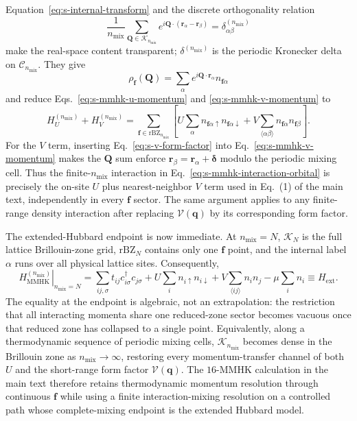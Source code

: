 \documentclass[10pt]{article}
\newcommand{\nmix}{n_{\mathrm{mix}}}
\begin{document}
Equation~\ref{eq:s-internal-transform} and the discrete orthogonality relation
\begin{equation}
 \frac{1}{\nmix}\sum_{\mathbf Q\in\mathcal K_{\nmix}}
 e^{i\mathbf Q\cdot(\mathbf r_\alpha-\mathbf r_\beta)}
 =\delta^{(\nmix)}_{\alpha\beta}
 \label{eq:s-discrete-orthogonality}
\end{equation}
make the real-space content transparent; $\delta^{(\nmix)}$ is the periodic Kronecker delta on $\mathcal C_{\nmix}$. They give
\begin{equation}
 \rho_{\mathbf f}(\mathbf Q)
 =\sum_{\alpha}e^{i\mathbf Q\cdot\mathbf r_\alpha}
 n_{\mathbf f\alpha}
 \label{eq:s-sector-density}
\end{equation}
and reduce Eqs.~\ref{eq:s-mmhk-u-momentum} and \ref{eq:s-mmhk-v-momentum} to
\begin{equation}
 H_U^{(\nmix)}+H_V^{(\nmix)}
 =\sum_{\mathbf f\in\mathrm{rBZ}_{\nmix}}
 \left[
 U\sum_\alpha n_{\mathbf f\alpha\uparrow}n_{\mathbf f\alpha\downarrow}
 +V\sum_{\langle\alpha\beta\rangle}
 n_{\mathbf f\alpha}n_{\mathbf f\beta}
 \right].
 \label{eq:s-mmhk-interaction-orbital}
\end{equation}
For the $V$ term, inserting Eq.~\ref{eq:s-v-form-factor} into Eq.~\ref{eq:s-mmhk-v-momentum} makes the $\mathbf Q$ sum enforce
$\mathbf r_\beta=\mathbf r_\alpha+\boldsymbol\delta$ modulo the periodic mixing cell. Thus the finite-$\nmix$ interaction in Eq.~\ref{eq:s-mmhk-interaction-orbital} is precisely the on-site $U$ plus nearest-neighbor $V$ term used in Eq.~(1) of the main text, independently in every $\mathbf f$ sector. The same argument applies to any finite-range density interaction after replacing $\mathcal V(\mathbf q)$ by its corresponding form factor.

The extended-Hubbard endpoint is now immediate. At $\nmix=N$, $\mathcal K_N$ is the full lattice Brillouin-zone grid, $\mathrm{rBZ}_N$ contains only one $\mathbf f$ point, and the internal label $\alpha$ runs over all physical lattice sites. Consequently,
\begin{equation}
 \boxed{
 \left.H_{\mathrm{MMHK}}^{(\nmix)}\right|_{\nmix=N}
 =\sum_{ij,\sigma}t_{ij}c^\dagger_{i\sigma}c_{j\sigma}
 +U\sum_i n_{i\uparrow}n_{i\downarrow}
 +V\sum_{\langle ij\rangle}n_i n_j
 -\mu\sum_i n_i
 \equiv H_{\mathrm{ext}} .}
 \label{eq:s-extended-hubbard-limit}
\end{equation}
The equality at the endpoint is algebraic, not an extrapolation: the restriction that all interacting momenta share one reduced-zone sector becomes vacuous once that reduced zone has collapsed to a single point. Equivalently, along a thermodynamic sequence of periodic mixing cells, $\mathcal K_{\nmix}$ becomes dense in the Brillouin zone as $\nmix\to\infty$, restoring every momentum-transfer channel of both $U$ and the short-range form factor $\mathcal V(\mathbf q)$. The $16$-MMHK calculation in the main text therefore retains thermodynamic momentum resolution through continuous $\mathbf f$ while using a finite interaction-mixing resolution on a controlled path whose complete-mixing endpoint is the extended Hubbard model.
\end{document}
